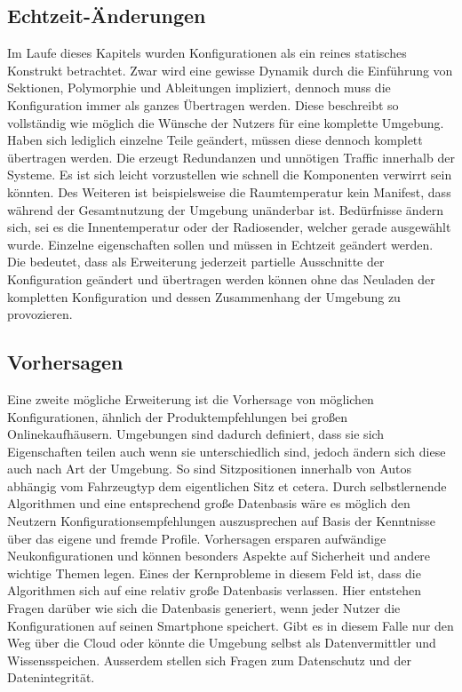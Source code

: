 \subsection{Echtzeit-Änderungen}
Im Laufe dieses Kapitels wurden Konfigurationen als ein reines statisches Konstrukt betrachtet. Zwar wird eine gewisse Dynamik durch die Einführung von Sektionen, Polymorphie und Ableitungen impliziert, dennoch muss die Konfiguration immer als ganzes Übertragen werden. Diese beschreibt so vollständig wie möglich die Wünsche der Nutzers für eine komplette Umgebung. Haben sich lediglich einzelne Teile geändert, müssen diese dennoch komplett übertragen werden. Die erzeugt Redundanzen und unnötigen Traffic innerhalb der Systeme. Es ist sich leicht vorzustellen wie schnell die Komponenten verwirrt sein könnten. Des Weiteren ist beispielsweise die Raumtemperatur kein Manifest, dass während der Gesamtnutzung der Umgebung unänderbar ist. Bedürfnisse ändern sich, sei es die Innentemperatur oder der Radiosender, welcher gerade ausgewählt wurde. Einzelne eigenschaften sollen und müssen in Echtzeit geändert werden. Die bedeutet, dass als Erweiterung jederzeit partielle Ausschnitte der Konfiguration geändert und übertragen werden können ohne das Neuladen der kompletten Konfiguration und dessen Zusammenhang der Umgebung zu provozieren.

\subsection{Vorhersagen}
Eine zweite mögliche Erweiterung ist die Vorhersage von möglichen Konfigurationen, ähnlich der Produktempfehlungen bei großen Onlinekaufhäusern. Umgebungen sind dadurch definiert, dass sie sich Eigenschaften teilen auch wenn sie unterschiedlich sind, jedoch ändern sich diese auch nach Art der Umgebung. So sind Sitzpositionen innerhalb von Autos abhängig vom Fahrzeugtyp dem eigentlichen Sitz et cetera. Durch selbstlernende Algorithmen und eine entsprechend große Datenbasis wäre es möglich den Neutzern Konfigurationsempfehlungen auszusprechen auf Basis der Kenntnisse über das eigene und fremde Profile. Vorhersagen ersparen aufwändige Neukonfigurationen und können besonders Aspekte auf Sicherheit und andere wichtige Themen legen. Eines der Kernprobleme in diesem Feld ist, dass die Algorithmen sich auf eine relativ große Datenbasis verlassen. Hier entstehen Fragen darüber wie sich die Datenbasis generiert, wenn jeder Nutzer die Konfigurationen auf seinen Smartphone speichert. Gibt es in diesem Falle nur den Weg über die Cloud oder könnte die Umgebung selbst als Datenvermittler und Wissensspeichen. Ausserdem stellen sich Fragen zum Datenschutz und der Datenintegrität. 

